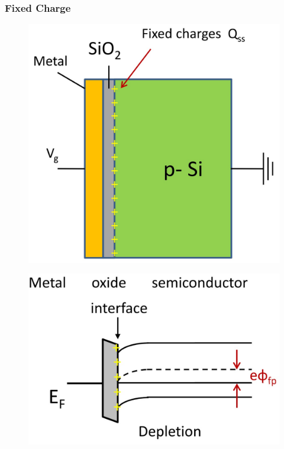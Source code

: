 \documentclass{beamer}
\begin{document}
    \begin{frame} \frametitle{Fixed Charge}
        \begin{minipage}{\linewidth}
            \begin{minipage}{0.45\linewidth}
                \begin{figure}[H]
                    \centering
                    \includegraphics[width=0.9\linewidth]{Fixed-charge.jpg}
                    \label{fig:Fixed-charge.jpg}
                \end{figure}
            \end{minipage}
            \begin{minipage}{0.45\linewidth}
                \begin{figure}[H]
                    \centering
                    \includegraphics[width=0.9\linewidth]{Fixed-charge-energy-band-diagram.jpg}
                    \label{fig:Fixed-charge-energy-band-diagram.jpg}
                \end{figure}
            \end{minipage}
        \end{minipage}
    \end{frame}
\end{document}
